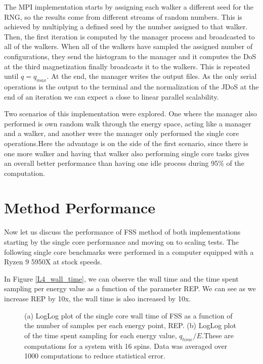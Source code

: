 	The MPI implementation starts by assigning each walker a different seed for the RNG, so the results come from different streams of random numbers. This is achieved by multiplying a defined seed by the number assigned to that walker. Then, the first iteration is computed by the manager process and broadcasted to all of the walkers. When all of the walkers have sampled the assigned number of configurations, they send the histogram to the manager and it computes the DoS at the third magnetization finally broadcasts it to the walkers. This is repeated until $q = q_{max}$. At the end, the manager writes the output files. As the only serial operations is the output to the terminal and the normalization of the JDoS at the end of an iteration we can expect a close to linear parallel scalability.

 
	Two scenarios of this implementation were explored. One where the manager also performed is own random walk through the energy space, acting like a manager and a walker, and another were the manager only performed the single core operations.Here the advantage is on the side of the first scenario, since there is one more walker and having that walker also performing single core tasks gives an overall better performance than having one idle process during 95\% of the computation.
\pagebreak

\section{Method Performance}

	Now let us discuss the performance of FSS method of both implementations starting by the single core performance and moving on to scaling tests. The following single core benchmarks were performed in a computer equipped with a Ryzen 9 5950X at stock speeds.  
	
	In Figure \ref{L4_wall_time}, we can observe the wall time and the time spent sampling per energy value as a function of the parameter REP. We can see as we increase REP by 10x, the wall time is also increased by 10x.
	
\begin{figure}[ht]
\centering
{}
\quad
\quad
\quad
{}	

\caption{(a) LogLog plot of the single core wall time of FSS as a function of the number of samples per each energy point, REP.  (b) LogLog plot of the time spent sampling for each energy value, $q_{time}/E$.These are computations for a system with 16 spins. Data was averaged over 1000 computations to reduce statistical error.}
\label{wall_time_L4}
\end{figure}

